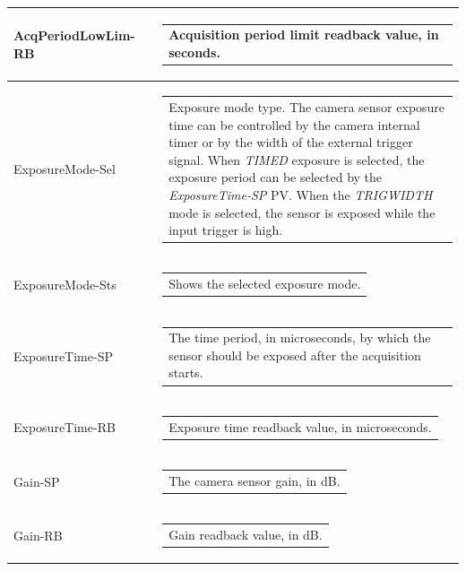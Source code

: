 \documentclass[openany]{article}
\begin{document}
\begin{longtable}{| m{3.0cm} m{4.5cm} m{7.0cm} |}
        AcqPeriodLowLim-RB &  & \begin{tabular}{@{}m{6cm}@{}}
                Acquisition period limit readback value, in seconds.
            \end{tabular} \hypertarget{pv:exp-mode}{}\\ \hline
        ExposureMode-Sel &  & \begin{tabular}{@{}m{6cm}@{}}
                Exposure mode type. The camera sensor exposure time can be controlled
                by the camera internal timer or by the width of the external trigger
                signal. When \emph{TIMED} exposure is selected, the exposure period can
                be selected by the \emph{ExposureTime-SP} PV. When the \emph{TRIGWIDTH}
                mode is selected, the sensor is exposed while the input trigger is high.
            \end{tabular} \\ \hline
        ExposureMode-Sts &  & \begin{tabular}{@{}m{6cm}@{}}
                Shows the selected exposure mode.
            \end{tabular} \hypertarget{pv:exp-time}{}\\ \hline
        ExposureTime-SP &  & \begin{tabular}{@{}m{6cm}@{}}
                The time period, in microseconds, by which the sensor should be exposed 
                after the acquisition starts.
            \end{tabular} \\ \hline
        ExposureTime-RB &  & \begin{tabular}{@{}m{6cm}@{}}
                Exposure time readback value, in microseconds.
            \end{tabular} \hypertarget{pv:gain}{}\\ \hline
        Gain-SP &  & \begin{tabular}{@{}m{6cm}@{}}
                The camera sensor gain, in dB.
            \end{tabular} \\ \hline
        Gain-RB &  & \begin{tabular}{@{}m{6cm}@{}}
                Gain readback value, in dB.
            \end{tabular} \hypertarget{pv:auto-gain}{}\\ \hline

\end{longtable}
\end{document}
